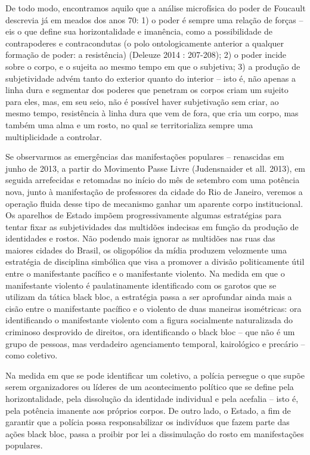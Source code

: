 De todo modo, encontramos aquilo que a análise microfísica do poder de
Foucault descrevia já em meados dos anos 70: 1) o poder é sempre uma
relação de forças -- eis o que define sua horizontalidade e imanência,
como a possibilidade de contrapoderes e contracondutas (o polo
ontologicamente anterior a qualquer formação de poder: a resistência)
(Deleuze 2014 : 207-208); 2) o poder incide sobre o corpo, e o sujeita
ao mesmo tempo em que o subjetiva; 3) a produção de subjetividade advém
tanto do exterior quanto do interior -- isto é, não apenas a linha dura
e segmentar dos poderes que penetram os corpos criam um sujeito para
eles, mas, em seu seio, não é possível haver subjetivação sem criar, ao
mesmo tempo, resistência à linha dura que vem de fora, que cria um
corpo, mas também uma alma e um rosto, no qual se territorializa sempre
uma multiplicidade a controlar.

Se observarmos as emergências das manifestações populares -- renascidas
em junho de 2013, a partir do Movimento Passe Livre (Judensnaider et
all. 2013), em seguida arrefecidas e retomadas no início do mês de
setembro com uma potência nova, junto à manifestação de professores da
cidade do Rio de Janeiro, veremos a operação fluida desse tipo de
mecanismo ganhar um aparente corpo institucional. Os aparelhos de Estado
impõem progressivamente algumas estratégias para tentar fixar as
subjetividades das multidões indecisas em função da produção de
identidades e rostos. Não podendo mais ignorar as multidões nas ruas das
maiores cidades do Brasil, os oligopólios da mídia produzem velozmente
uma estratégia de disciplina simbólica que visa a promover a divisão
politicamente útil entre o manifestante pacífico e o manifestante
violento. Na medida em que o manifestante violento é paulatinamente
identificado com os garotos que se utilizam da tática black bloc, a
estratégia passa a ser aprofundar ainda mais a cisão entre o
manifestante pacífico e o violento de duas maneiras isométricas: ora
identificando o manifestante violento com a figura socialmente
naturalizada do criminoso desprovido de direitos, ora identificando o
black bloc -- que não é um grupo de pessoas, mas verdadeiro agenciamento
temporal, kairológico e precário -- como coletivo.

Na medida em que se pode identificar um coletivo, a polícia persegue o
que supõe serem organizadores ou líderes de um acontecimento político
que se define pela horizontalidade, pela dissolução da identidade
individual e pela acefalia -- isto é, pela potência imanente aos
próprios corpos. De outro lado, o Estado, a fim de garantir que a
polícia possa responsabilizar os indivíduos que fazem parte das ações
black bloc, passa a proibir por lei a dissimulação do rosto em
manifestações populares.

